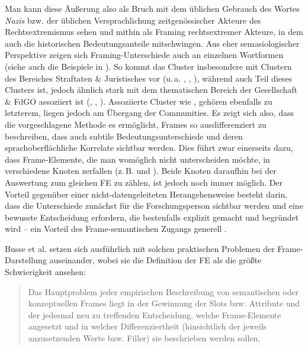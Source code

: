 Man kann diese Äußerung also als Bruch mit dem üblichen Gebrauch des Wortes \emph{Nazis} bzw. der üblichen Versprachlichung zeitgenössischer Akteure des Rechtsextremismus sehen und mithin als Framing rechtsextremer Akteure, in dem auch die historischen Bedeutungsanteile mitschwingen. Aus eher semasiologischer Perspektive zeigen sich Framing-Unterschiede auch an einzelnen Wortformen (siehe auch die Beispiele in ). So kommt das Cluster  insbesondere mit Clustern des Bereiches Straftaten \& Juristisches vor (u.\,a. , , ), während  auch Teil dieses Clusters ist, jedoch ähnlich stark mit dem thematischen Bereich der Gesellschaft \& FdGO assoziiert ist (, , ). Assoziierte Cluster wie ,  gehören ebenfalls zu letzterem, liegen jedoch am Übergang der Communities. Es zeigt sich also, dass die vorgeschlagene Methode es ermöglicht, Frames so ausdifferenziert zu beschreiben, dass auch subtile Bedeutungsunterschiede und deren sprachoberflächliche Korrelate sichtbar werden. Dies führt zwar einerseits dazu, dass Frame-Elemente, die man womöglich nicht unterscheiden möchte, in verschiedene Knoten zerfallen (z.\,B.  und ). Beide Knoten daraufhin bei der Auswertung zum gleichen FE zu zählen, ist jedoch noch immer möglich. Der Vorteil gegenüber einer nicht-datengeleiteten Herangehensweise besteht darin, dass die Unterschiede zunächst für die Forschungsperson sichtbar werden und eine bewusste Entscheidung erfordern, die bestenfalls explizit gemacht und begründet wird -- ein Vorteil des Frame-semantischen Zugangs generell \autocite[341]{busseBedeutungsUndBegriffswissen2018}.

Busse et al. setzen sich ausführlich mit solchen praktischen Problemen der Frame-Darstellung auseinander, wobei sie die Definition der FE als die größte Schwierigkeit ansehen:

\begin{quote}
Das Hauptproblem jeder empirischen Beschreibung von semantischen oder konzeptuellen Frames liegt in der Gewinnung der Slots bzw. Attribute und der jedesmal neu zu treffenden Entscheidung, welche Frame-Elemente angesetzt und in welcher Differenziertheit (hinsichtlich der jeweils anzusetzenden Werte bzw. Filler) sie beschrieben werden sollen. \autocite[77]{busseBedeutungsUndBegriffswissen2018}
\end{quote}

